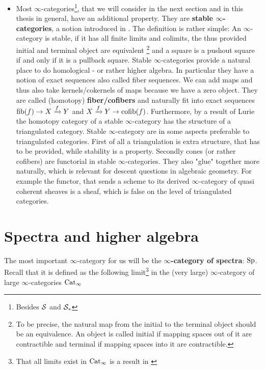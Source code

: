 \begin{itemize}
    \item Most $\infty$-categories\footnote{Besides $\mathcal{S}$ and $\mathcal{S}_*$}, that we will consider in the next section and in this thesis in general, have an additional property. They are \textbf{stable $\infty$-categories}, a notion introduced in \cite[Section~1.1]{lurie2017higher}. The definition is rather simple: An $\infty$-category is stable, if it has all finite limits and colimits, the thus provided initial and terminal object are equivalent \footnote{To be precise, the natural map from the initial to the terminal object should be an equivalence. An object is called initial if mapping spaces out of it are contractible and terminal if mapping spaces into it are contractible.} and a square is a pushout square if and only if it is a pullback square.  Stable $\infty$-categories provide a natural place to do homological - or rather higher algebra. In particular they have a notion of exact sequences also called fiber sequences. We can add maps and thus also take kernels/cokernels of maps because we have a zero object. They are called (homotopy) \textbf{fiber/cofibers} and naturally fit into exact sequences $\operatorname{fib}(f)\rightarrow X\xrightarrow{f} Y$ and $X\xrightarrow{f} Y\rightarrow \operatorname{cofib}(f)$. Furthermore, by a result of Lurie \cite[Theorem~1.1.2.14]{lurie2017higher} the homotopy category of a stable $\infty$-category has the structure of a triangulated category. Stable $\infty$-category are in some aspects preferable to triangulated categories. First of all a triangulation is extra structure, that has to be provided, while stability is a property. Secondly cones (or rather cofibers) are functorial in stable $\infty$-categories. 
    They also "glue" together more naturally, which is relevant for descent questions in algebraic geometry. For example the functor, that sends a scheme to its derived $\infty$-category of quasi coherent sheaves is a sheaf, which is false on the level of triangulated categories.
    
\end{itemize}
\section{Spectra and higher algebra}
The most important $\infty$-category for us will be the\textbf{ $\infty$-category of spectra}: $\operatorname{Sp}$. Recall that it is defined as the following limit\footnote{That all limits exist in $\operatorname{Cat}_\infty$ is a result in \cite[Section~3.3.3]{HigherToposTheory}} in the (very large) $\infty$-category of large $\infty$-categories $\operatorname{Cat}_\infty$

